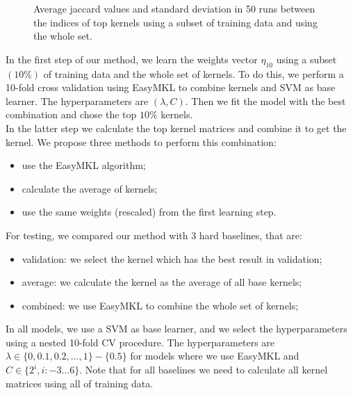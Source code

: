 \documentclass{esannV2}
\newcommand{\1}{{\bf 1}}
\begin{document}
\begin{figure}[!htb]
\centering
{}
\caption{Average jaccard values and standard deviation in 50 runs between the indices of top kernels using a subset of training data and using the whole set.}
\label{fig:jaccard}
\end{figure}

In the first step of our method, we learn the weights vector $\eta_{10}$ using a subset $(10\%)$ of training data and the whole set of kernels. To do this, we perform a 10-fold cross validation using EasyMKL to combine kernels and SVM as base learner. The hyperparameters are $(\lambda,C)$. Then we fit the model with the best combination and chose the top $10\%$ kernels.\\
In the latter step we calculate the top kernel matrices and combine it to get the kernel. We propose three methods to perform this combination:
\begin{itemize}
\item{}use the EasyMKL algorithm;
\item{}calculate the average of kernels;
\item{}use the same weights (rescaled) from the first learning step.
\end{itemize}
For testing, we compared our method with 3 hard baselines, that are:
\begin{itemize}
\item{}validation: we select the kernel which has the best result in validation;
\item{}average: we calculate the kernel as the average of all base kernels;
\item{}combined: we use EasyMKL to combine the whole set of kernels;
\end{itemize}
In all models, we use a SVM as base learner, and we select the hyperparameters using a nested 10-fold CV procedure. The hyperparameters are $\lambda\in\{0,0.1,0.2,\dots,1\}-\{0.5\}$ for models where we use EasyMKL and $C\in\{2^i, i:-3\dots6\}$.
Note that for all baselines we need to calculate all kernel matrices using all of training data.
\end{document}
